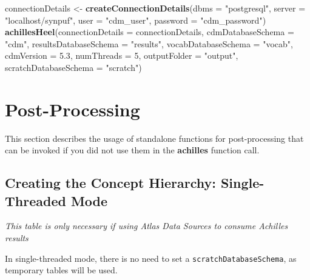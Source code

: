 \documentclass[]{article}
\newenvironment{Shaded}{\begin{snugshade}}{\end{snugshade}}
\newcommand{\KeywordTok}[1]{\textcolor[rgb]{0.13,0.29,0.53}{\textbf{#1}}}
\newcommand{\DataTypeTok}[1]{\textcolor[rgb]{0.13,0.29,0.53}{#1}}
\newcommand{\DecValTok}[1]{\textcolor[rgb]{0.00,0.00,0.81}{#1}}
\newcommand{\FloatTok}[1]{\textcolor[rgb]{0.00,0.00,0.81}{#1}}
\newcommand{\StringTok}[1]{\textcolor[rgb]{0.31,0.60,0.02}{#1}}
\newcommand{\NormalTok}[1]{#1}
\begin{document}
\begin{Shaded}
\begin{Highlighting}[]
\NormalTok{connectionDetails <-}\StringTok{ }\KeywordTok{createConnectionDetails}\NormalTok{(}\DataTypeTok{dbms =} \StringTok{"postgresql"}\NormalTok{, }
                                             \DataTypeTok{server =} \StringTok{"localhost/synpuf"}\NormalTok{, }
                                             \DataTypeTok{user =} \StringTok{"cdm_user"}\NormalTok{, }
                                             \DataTypeTok{password =} \StringTok{"cdm_password"}\NormalTok{)}
\KeywordTok{achillesHeel}\NormalTok{(}\DataTypeTok{connectionDetails =}\NormalTok{ connectionDetails, }
             \DataTypeTok{cdmDatabaseSchema =} \StringTok{"cdm"}\NormalTok{, }
             \DataTypeTok{resultsDatabaseSchema =} \StringTok{"results"}\NormalTok{, }
             \DataTypeTok{vocabDatabaseSchema =} \StringTok{"vocab"}\NormalTok{, }
             \DataTypeTok{cdmVersion =} \FloatTok{5.3}\NormalTok{, }
             \DataTypeTok{numThreads =} \DecValTok{5}\NormalTok{, }
             \DataTypeTok{outputFolder =} \StringTok{"output"}\NormalTok{, }
             \DataTypeTok{scratchDatabaseSchema =} \StringTok{"scratch"}\NormalTok{)}
\end{Highlighting}
\end{Shaded}

\section{Post-Processing}\label{post-processing}

This section describes the usage of standalone functions for
post-processing that can be invoked if you did not use them in the
\textbf{achilles} function call.

\subsection{Creating the Concept Hierarchy: Single-Threaded
Mode}\label{creating-the-concept-hierarchy-single-threaded-mode}

\emph{This table is only necessary if using Atlas Data Sources to
consume Achilles results}

In single-threaded mode, there is no need to set a
\texttt{scratchDatabaseSchema}, as temporary tables will be used.
\end{document}
